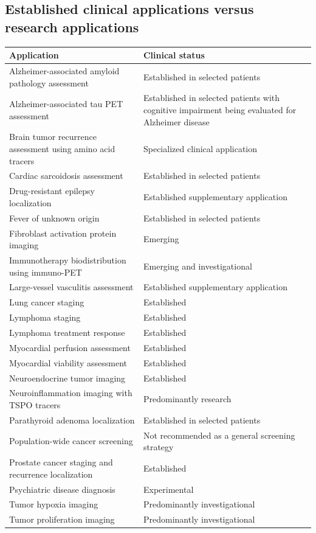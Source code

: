 \subsection{Established clinical applications versus research applications}
\begin{longtable}{@{}p{}p{}@{}}
\toprule
\textbf{Application} & \textbf{Clinical status} \\
\midrule
Alzheimer-associated amyloid pathology assessment & Established in selected patients \\
Alzheimer-associated tau PET assessment & Established in selected patients with cognitive impairment being evaluated for Alzheimer disease \\
Brain tumor recurrence assessment using amino acid tracers & Specialized clinical application \\
Cardiac sarcoidosis assessment & Established in selected patients \\
Drug-resistant epilepsy localization & Established supplementary application \\
Fever of unknown origin & Established in selected patients \\
Fibroblast activation protein imaging & Emerging \\
Immunotherapy biodistribution using immuno-PET & Emerging and investigational \\
Large-vessel vasculitis assessment & Established supplementary application \\
Lung cancer staging & Established \\
Lymphoma staging & Established \\
Lymphoma treatment response & Established \\
Myocardial perfusion assessment & Established \\
Myocardial viability assessment & Established \\
Neuroendocrine tumor imaging & Established \\
Neuroinflammation imaging with TSPO tracers & Predominantly research \\
Parathyroid adenoma localization & Established in selected patients \\
Population-wide cancer screening & Not recommended as a general screening strategy \\
Prostate cancer staging and recurrence localization & Established \\
Psychiatric disease diagnosis & Experimental \\
Tumor hypoxia imaging & Predominantly investigational \\
Tumor proliferation imaging & Predominantly investigational \\
\bottomrule
\end{longtable}

